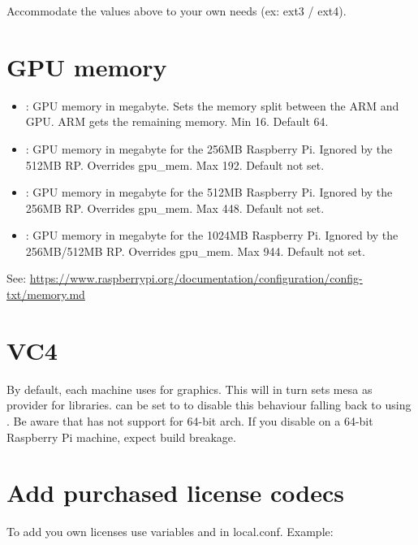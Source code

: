 \documentclass[letterpaper,10pt,english]{sphinxmanual}
\begin{document}
Accommodate the values above to your own needs (ex: ext3 / ext4).


\section{GPU memory}
\label{extra-build-config:gpu-memory}\begin{itemize}
\item {} 
: GPU memory in megabyte. Sets the memory split between the ARM and
GPU. ARM gets the remaining memory. Min 16. Default 64.

\item {} 
: GPU memory in megabyte for the 256MB Raspberry Pi. Ignored by
the 512MB RP. Overrides gpu\_mem. Max 192. Default not set.

\item {} 
: GPU memory in megabyte for the 512MB Raspberry Pi. Ignored by
the 256MB RP. Overrides gpu\_mem. Max 448. Default not set.

\item {} 
: GPU memory in megabyte for the 1024MB Raspberry Pi. Ignored by
the 256MB/512MB RP. Overrides gpu\_mem. Max 944. Default not set.

\end{itemize}

See: \href{https://www.raspberrypi.org/documentation/configuration/config-txt/memory}{https://www.raspberrypi.org/documentation/configuration/config-txt/memory.md}


\section{VC4}
\label{extra-build-config:vc4}
By default, each machine uses  for graphics. This will in turn sets mesa as provider for  libraries.  can be set to  to disable this behaviour falling back to using . Be aware that  has not support for 64-bit arch. If you disable  on a 64-bit Raspberry Pi machine, expect build breakage.


\section{Add purchased license codecs}
\label{extra-build-config:add-purchased-license-codecs}
To add you own licenses use variables  and  in
local.conf. Example:
\end{document}
